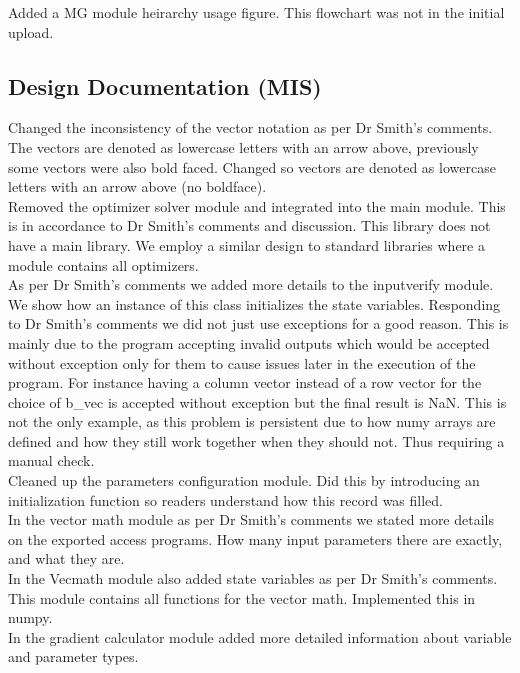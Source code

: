 \documentclass{article}
\begin{document}
Added a MG module heirarchy usage figure. This flowchart was not in the initial upload.

\subsection{Design Documentation (MIS)}
Changed the inconsistency of the vector notation as per Dr Smith's comments. The vectors are denoted as lowercase letters with an arrow above, previously some vectors were also bold faced. Changed so vectors are denoted as lowercase letters with an arrow above (no boldface).
\\

Removed the optimizer solver module and integrated into the main module. This is in accordance to Dr Smith's comments and discussion. This library does not have a main library. We employ a similar design to standard libraries where a module contains all optimizers.
\\

As per Dr Smith's comments we added more details to the inputverify module. We show how an instance of this class initializes the state variables. Responding to Dr Smith's comments we did not just use exceptions for a good reason. This is mainly due to the program accepting invalid outputs which would be accepted without exception only for them to cause issues later in the execution of the program. For instance having a column vector instead of a row vector for the choice of b\_vec is accepted without exception but the final result is NaN. This is not the only example, as this problem is persistent due to how numy arrays are defined and how they still work together when they should not. Thus requiring a manual check.
\\

Cleaned up the parameters configuration module. Did this by introducing an initialization function so readers understand how this record was filled. 
\\

In the vector math module as per Dr Smith's comments we stated more details on the exported access programs. How many input parameters there are exactly, and what they are.
\\

In the Vecmath module also added state variables as per Dr Smith's comments. This module contains all functions for the vector math. Implemented this in numpy.
\\

In the gradient calculator module added more detailed information about variable and parameter types.
\\
\end{document}
